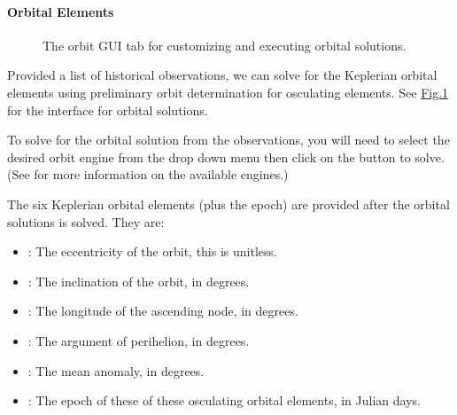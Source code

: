 \documentclass[letterpaper,11pt,english]{sphinxmanual}
\begin{document}
\paragraph{Orbital Elements}
\label{\detokenize{user/manual_mode:orbital-elements}}\label{\detokenize{user/manual_mode:user-manual-mode-procedure-orbital-elements}}
\begin{figure}[htbp]
\centering
\capstart

\noindent{}
\caption{The orbit GUI tab for customizing and executing orbital solutions.}\label{\detokenize{user/manual_mode:id8}}\label{\detokenize{user/manual_mode:figure-manual-mode-gui-orbit}}\end{figure}

\sphinxAtStartPar
Provided a list of historical observations, we can solve for the Keplerian
orbital elements using preliminary orbit determination for osculating elements.
See \hyperref[\detokenize{user/manual_mode:figure-manual-mode-gui-orbit}]{Fig.\@ \ref{\detokenize{user/manual_mode:figure-manual-mode-gui-orbit}}} for the interface for orbital
solutions.

\sphinxAtStartPar
To solve for the orbital solution from the observations, you will need to
select the desired orbit engine from the drop down menu then click on the
 button to solve.
(See {\hyperref[\detokenize{technical/architecture/services_engines:technical-architecture-services-engines}]{}} for more information on
the available engines.)

\sphinxAtStartPar
The six Keplerian orbital elements (plus the epoch) are provided after the
orbital solutions is solved. They are:
\begin{itemize}
\item {} 
\sphinxAtStartPar
{}: The eccentricity of the orbit, this is unit\sphinxhyphen{}less.

\item {} 
\sphinxAtStartPar
{}: The inclination of the orbit, in degrees.

\item {} 
\sphinxAtStartPar
{}: The longitude of the ascending node, in degrees.

\item {} 
\sphinxAtStartPar
{}: The argument of perihelion, in degrees.

\item {} 
\sphinxAtStartPar
{}: The mean anomaly, in degrees.

\item {} 
\sphinxAtStartPar
{}: The epoch of these of these osculating orbital elements, in Julian days.

\end{itemize}
\end{document}
